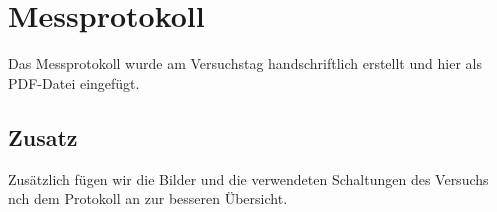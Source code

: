 

\def\skalierung{0.65}

\chapter{Messprotokoll}
\label{chap:protokoll}

Das Messprotokoll wurde am Versuchstag handschriftlich erstellt und hier als
PDF-Datei eingefügt. 

\section*{Zusatz}
Zusätzlich fügen wir die Bilder und die verwendeten Schaltungen des Versuchs nch dem Protokoll an zur besseren Übersicht.

%



